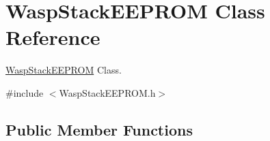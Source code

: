 \hypertarget{class_wasp_stack_e_e_p_r_o_m}{}\section{Wasp\+Stack\+E\+E\+P\+R\+OM Class Reference}
\label{class_wasp_stack_e_e_p_r_o_m}


\hyperlink{class_wasp_stack_e_e_p_r_o_m}{Wasp\+Stack\+E\+E\+P\+R\+OM} Class.  




{\ttfamily \#include $<$Wasp\+Stack\+E\+E\+P\+R\+O\+M.\+h$>$}

\subsection*{Public Member Functions}
